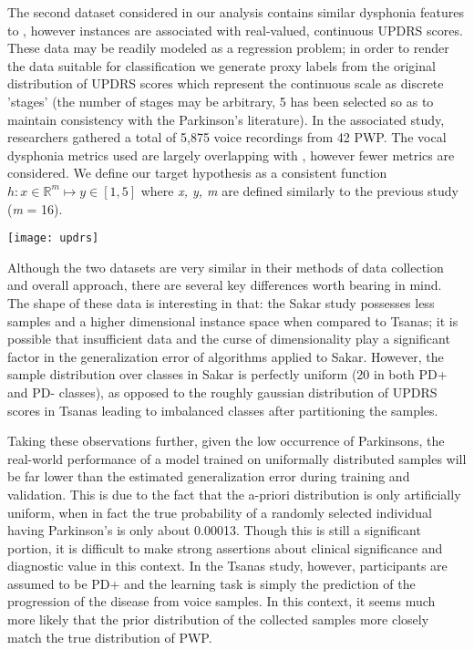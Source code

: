 \documentclass[12pt]{article}
\begin{document}
The second dataset considered in our analysis contains similar dysphonia features to \cite{Sakar2013}, however instances are associated with real-valued, continuous UPDRS scores. These data may be readily modeled as a regression problem; in order to render the data suitable for classification we generate proxy labels from the original distribution of UPDRS scores which represent the continuous scale as discrete 'stages' (the number of stages may be arbitrary, 5 has been selected so as to maintain consistency with the Parkinson's literature). In the associated study, researchers gathered a total of 5,875 voice recordings from 42 PWP. The vocal dysphonia metrics used are largely overlapping with \cite{Sakar2013}, however fewer metrics are considered. We define our target hypothesis as a consistent function $ h : x \in \mathbb{R}^m \mapsto y \in [1,5] $ where \textit{x, y, m} are defined similarly to the previous study (\textit{m} = 16).

\texttt{[image: updrs]}

Although the two datasets are very similar in their methods of data collection and overall approach, there are several key differences worth bearing in mind. The shape of these data is interesting in that: the Sakar study possesses less samples and a higher dimensional instance space when compared to Tsanas; it is possible that insufficient data and the curse of dimensionality play a significant factor in the generalization error of algorithms applied to Sakar. However, the sample distribution over classes in Sakar is perfectly uniform (20 in both PD+ and PD- classes), as opposed to the roughly gaussian distribution of UPDRS scores in Tsanas leading to imbalanced classes after partitioning the samples.

Taking these observations further, given the low occurrence of Parkinsons, the real-world performance of a model trained on uniformally distributed samples will be far lower than the estimated generalization error during training and validation. This is due to the fact that the a-priori distribution is only artificially uniform, when in fact the true probability of a randomly selected individual having Parkinson's is only about 0.00013. Though this is still a significant portion, it is difficult to make strong assertions about clinical significance and diagnostic value in this context. In the Tsanas study, however, participants are assumed to be PD+ and the learning task is simply the prediction of the progression of the disease from voice samples. In this context, it seems much more likely that the prior distribution of the collected samples more closely match the true distribution of PWP.
\end{document}
